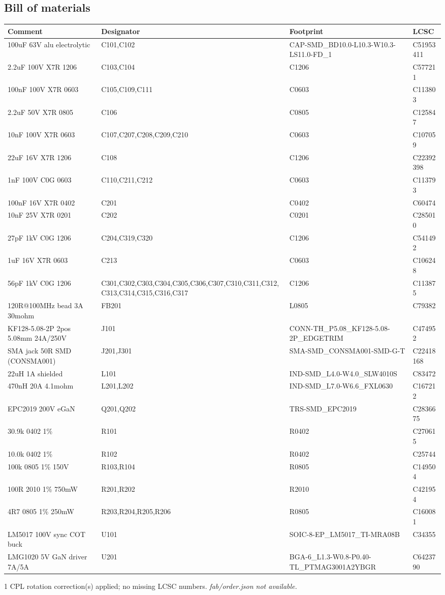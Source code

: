 \documentclass[11pt,a4paper]{article}
\begin{document}
\subsection*{Bill of materials}
{\small
\begin{longtable}{p{4.4cm}p{2.8cm}p{4.6cm}l}
\toprule
\textbf{Comment} & \textbf{Designator} & \textbf{Footprint} & \textbf{LCSC} \\
\midrule
\endhead
100uF 63V alu electrolytic & C101,C102 & CAP-SMD\_BD10.0-L10.3-W10.3-LS11.0-FD\_1 & C51953411 \\
2.2uF 100V X7R 1206 & C103,C104 & C1206 & C577211 \\
100nF 100V X7R 0603 & C105,C109,C111 & C0603 & C113803 \\
2.2uF 50V X7R 0805 & C106 & C0805 & C125847 \\
10nF 100V X7R 0603 & C107,C207,C208,C209,C210 & C0603 & C107059 \\
22uF 16V X7R 1206 & C108 & C1206 & C22392398 \\
1nF 100V C0G 0603 & C110,C211,C212 & C0603 & C113793 \\
100nF 16V X7R 0402 & C201 & C0402 & C60474 \\
10nF 25V X7R 0201 & C202 & C0201 & C285010 \\
27pF 1kV C0G 1206 & C204,C319,C320 & C1206 & C541492 \\
1uF 16V X7R 0603 & C213 & C0603 & C106248 \\
56pF 1kV C0G 1206 & C301,C302,C303,C304,C305,C306,C307,C310,C311,C312,C313,C314,C315,C316,C317 & C1206 & C113875 \\
120R@100MHz bead 3A 30mohm & FB201 & L0805 & C79382 \\
KF128-5.08-2P 2pos 5.08mm 24A/250V & J101 & CONN-TH\_P5.08\_KF128-5.08-2P\_EDGETRIM & C474952 \\
SMA jack 50R SMD (CONSMA001) & J201,J301 & SMA-SMD\_CONSMA001-SMD-G-T & C22418168 \\
22uH 1A shielded & L101 & IND-SMD\_L4.0-W4.0\_SLW4010S & C83472 \\
470nH 20A 4.1mohm & L201,L202 & IND-SMD\_L7.0-W6.6\_FXL0630 & C167212 \\
EPC2019 200V eGaN & Q201,Q202 & TRS-SMD\_EPC2019 & C2836675 \\
30.9k 0402 1\% & R101 & R0402 & C270615 \\
10.0k 0402 1\% & R102 & R0402 & C25744 \\
100k 0805 1\% 150V & R103,R104 & R0805 & C149504 \\
100R 2010 1\% 750mW & R201,R202 & R2010 & C421954 \\
4R7 0805 1\% 250mW & R203,R204,R205,R206 & R0805 & C160081 \\
LM5017 100V sync COT buck & U101 & SOIC-8-EP\_LM5017\_TI-MRA08B & C34355 \\
LMG1020 5V GaN driver 7A/5A & U201 & BGA-6\_L1.3-W0.8-P0.40-TL\_PTMAG3001A2YBGR & C6423790 \\
\bottomrule
\end{longtable}
}
1 CPL rotation correction(s) applied; no missing LCSC numbers.
\emph{fab/order.json not available.}
\end{document}
